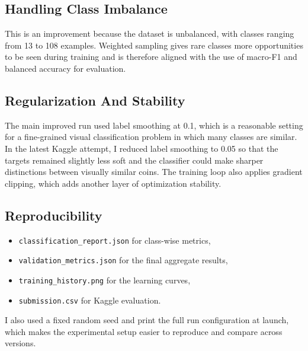 \documentclass[11pt,a4paper]{article}
\newcommand{\code}[1]{\texttt{#1}}
\begin{document}
\subsection{Handling Class Imbalance}
This is an improvement because the dataset is unbalanced, with classes ranging from 13 to 108 examples. Weighted sampling gives rare classes more opportunities to be seen during training and is therefore aligned with the use of macro-F1 and balanced accuracy for evaluation.

\subsection{Regularization And Stability}
The main improved run used label smoothing at 0.1, which is a reasonable setting for a fine-grained visual classification problem in which many classes are similar. In the latest Kaggle attempt, I reduced label smoothing to 0.05 so that the targets remained slightly less soft and the classifier could make sharper distinctions between visually similar coins. The training loop also applies gradient clipping, which adds another layer of optimization stability.

\subsection{Reproducibility}

\begin{itemize}[leftmargin=1.4em]
    \item \code{classification\_report.json} for class-wise metrics,
    \item \code{validation\_metrics.json} for the final aggregate results,
    \item \code{training\_history.png} for the learning curves,
    \item \code{submission.csv} for Kaggle evaluation.
\end{itemize}

I also used a fixed random seed and print the full run configuration at launch, which makes the experimental setup easier to reproduce and compare across versions.
\end{document}
